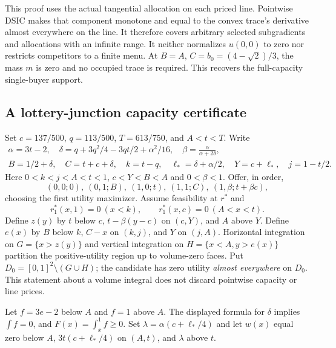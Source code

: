 This proof uses the actual tangential allocation on each priced line.
Pointwise DSIC makes that component monotone and equal to the convex trace's
derivative almost everywhere on the line. It therefore covers arbitrary
selected subgradients and allocations with an infinite range. It neither
normalizes $u(0,0)$ to zero nor restricts competitors to a finite menu.
At $B=A$, $C=b_0=(4-\sqrt2)/3$, the mass $m$ is zero and no occupied
trace is required. This recovers the full-capacity single-buyer support.

\subsection{A lottery-junction capacity certificate}\label{sec:lottery-support}

Set $c=137/500$, $q=113/500$, $T=613/750$, and $A<t<T$. Write
\[
\begin{gathered}
\alpha=3t-2,\quad
\delta=q+3q^2/4-3qt/2+\alpha^2/16,\quad
\beta=\frac{\alpha}{\alpha+2\delta},\\
B=1/2+\delta,\quad C=t+c+\delta,\quad k=t-q,\quad
\ell_*=\delta+\alpha/2,\quad Y=c+\ell_*,\quad j=1-t/2.
\end{gathered}
\]
Here $0<k<j<A<t<1$, $c<Y<B<A$ and $0<\beta<1$. Offer, in order,
\[
(0,0;0),\ (0,1;B),\ (1,0;t),\ (1,1;C),\
(1,\beta;t+\beta c),
\]
choosing the first utility maximizer. Assume feasibility at $r^*$ and
\begin{equation}\label{eq:lottery-traces}
r^*_1(x,1)=0\ (x<k),\qquad
r^*_1(x,c)=0\ (A<x<t).
\end{equation}
Define $z(y)$ by $t$ below $c$, $t-\beta(y-c)$ on $(c,Y)$, and $A$
above $Y$. Define $e(x)$ by $B$ below $k$, $C-x$ on $(k,j)$, and $Y$
on $(j,A)$. Horizontal integration on $G=\{x>z(y)\}$ and vertical
integration on $H=\{x<A,y>e(x)\}$ partition the positive-utility region
up to volume-zero faces. Put $D_0=[0,1]^2\setminus(G\cup H)$; the
candidate has zero utility \emph{almost everywhere} on $D_0$. This statement
about a volume integral does not discard pointwise capacity or line prices.

Let $f=3e-2$ below $A$ and $f=1$ above $A$. The displayed formula for
$\delta$ implies $\int f=0$, and $F(x)=\int_x^1 f\ge0$. Set
$\lambda=\alpha(c+\ell_*/4)$ and let $w(x)$ equal zero below $A$,
$3t(c+\ell_*/4)$ on $(A,t)$, and $\lambda$ above $t$.

